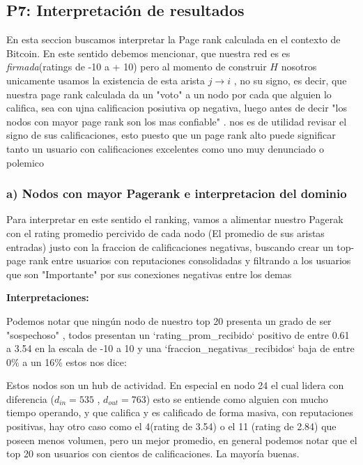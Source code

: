 \documentclass{article}
\begin{document}
\subsection*{P7: Interpretación de resultados}

En esta seccion buscamos interpretar la Page rank calculada en el contexto de Bitcoin. En este sentido debemos mencionar, que nuestra red es es \textit{firmada}(ratings de -10 a + 10) pero al momento de construir $H$ nosotros unicamente usamos la existencia de esta arista $j \to i$ , no su signo, es decir, que nuestra page rank calculada da un "voto" a un nodo por cada que alguien lo califica, sea con ujna calificacion posiutiva op negativa, luego antes de decir "los nodos con mayor page rank son los mas confiable" . nos es de utilidad revisar el signo de sus calificaciones, esto puesto que un page rank alto puede significar tanto un usuario con calificaciones excelentes como uno muy denunciado o polemico



\subsubsection*{a) Nodos con mayor Pagerank e interpretacion del dominio}

Para interpretar en este sentido el ranking, vamos a alimentar nuestro Pagerak con el rating promedio percivido de cada nodo (El promedio de sus aristas entradas) justo con la fraccion de calificaciones negativas, buscando crear un top-page rank entre usuarios con reputaciones consolidadas y filtrando a los usuarios que son "Importante" por sus conexiones negativas entre los demas



\textbf{Interpretaciones:}

Podemos notar que ningún nodo de nuestro top 20 presenta un grado de ser "sospechoso" , todos presentan un `rating\_prom\_recibido` positivo de entre 0.61 a 3.54 en la escala de -10 a 10 y una `fraccion\_negativas\_recibidos` baja de entre 0\% a un 16\% estos nos dice:

Estos nodos son un hub de actividad. En especial en nodo 24 el cual lidera con diferencia ($d_{in} = 535$ , $d_{out} = 763$) esto se entiende como alguien con mucho tiempo operando, y que califica y es calificado de forma masiva, con reputaciones positivas, hay otro caso como el 4(rating de 3.54) o el 11 (rating de 2.84) que poseen menos volumen, pero un mejor promedio, en general podemos notar que el top 20 son usuarios con cientos de calificaciones. La mayoría buenas.
\end{document}
